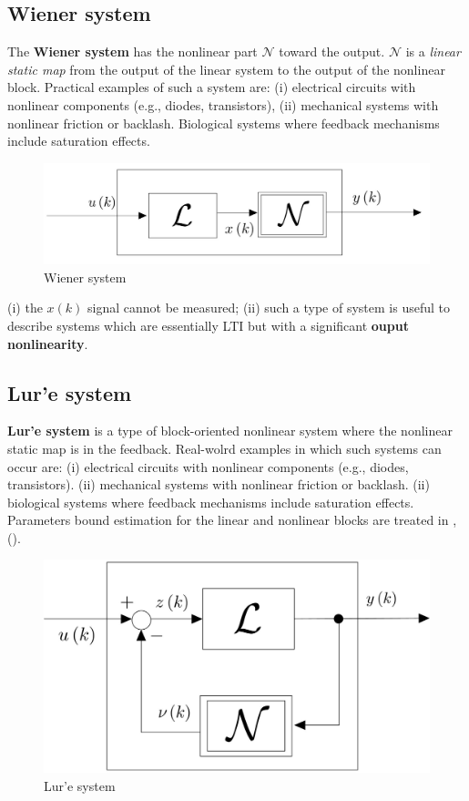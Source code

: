 \subsection{Wiener system}
The \textbf{Wiener system} has the nonlinear part $\mathcal{N}$ toward the output. $\mathcal{N}$ is a \textit{linear static map} from the output of the linear system to the output of the nonlinear block. Practical examples of such a system are: (i) electrical circuits with nonlinear components (e.g., diodes, transistors), (ii) mechanical systems with nonlinear friction or backlash.
Biological systems where feedback mechanisms include saturation effects.
\begin{figure}[h]
    \centering
    \includegraphics[scale=0.2]{img/Wiener.jpg}
    \caption{Wiener system}
\end{figure}
\begin{remark}
    (i) the $x(k)$ signal cannot be measured; (ii) such a type of system is useful to describe systems which are essentially LTI but with a significant \textbf{ouput nonlinearity}.
\end{remark}

\subsection{Lur'e system}
\textbf{Lur'e system} is a type of block-oriented nonlinear system where the nonlinear static map is in the feedback. Real-wolrd examples in which such systems can occur are: (i) electrical circuits with nonlinear components (e.g., diodes, transistors). (ii) mechanical systems with nonlinear friction or backlash. (ii) biological systems where feedback mechanisms include saturation effects. Parameters bound estimation for the linear and nonlinear blocks are treated in \citeauthor{cerone2013bounding},  (). \\

\begin{figure}
    \centering
    \includegraphics[scale=0.15]{img/lure.jpg}
    \caption{Lur'e system}
\end{figure} 


